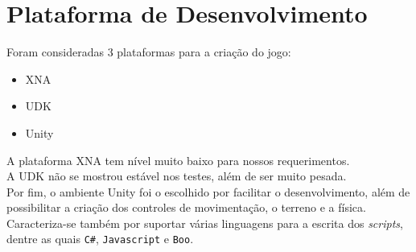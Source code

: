 \documentclass[letterpaper,11pt]{article}
\begin{document}
\section{Plataforma de Desenvolvimento}
 Foram consideradas 3 plataformas para a criação do jogo:
 \begin{itemize}
  \item XNA
  \item UDK
  \item Unity
 \end{itemize}
 A plataforma XNA tem nível muito baixo para nossos requerimentos. \\
 A UDK não se mostrou estável nos testes, além de ser muito pesada. \\
 Por fim, o ambiente Unity foi o escolhido por facilitar o desenvolvimento, além de possibilitar a criação dos controles de movimentação, o terreno e a física. Caracteriza-se também por suportar várias linguagens para a escrita dos \textit{scripts}, dentre as quais \verb+C#+, \verb+Javascript+ e \verb+Boo+.
\end{document}
